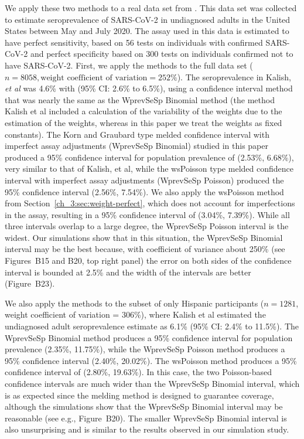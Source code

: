 We apply these two methods to a real data set from \citep{Kali:2021}.
This data set was collected to estimate seroprevalence of SARS-CoV-2 in undiagnosed adults in the United States between May and July 2020.
The assay used in this data is estimated to have perfect sensitivity, based on 56 tests on individuals with confirmed SARS-CoV-2 and perfect specificity based on 300 tests on individuals confirmed not to have SARS-CoV-2.
First, we apply the methods to the full data set (\( n = 8058, \text{weight coefficient of variation} = 252\%\)).
The seroprevalence in Kalish, {\it et al } was 4.6\% with (95\% CI: 2.6\% to 6.5\%), using a confidence interval method that was nearly the same as the WprevSeSp Binomial method (the method Kalish et al included a calculation of the variability of the weights due to the estimation of the weights, whereas in this paper we treat the weights as fixed constants).
The Korn and Graubard type melded confidence interval with imperfect assay adjustments (WprevSeSp Binomial) studied in this paper produced a 95\% confidence interval for population prevalence of (2.53\%, 6.68\%), very similar to that of Kalish, et al, while the wsPoisson type melded confidence interval with imperfect assay adjustments (WprevSeSp Poisson) produced the 95\% confidence interval (2.56\%, 7.54\%).
We also apply the wsPoisson method from Section~\ref{ch_3:sec:weight-perfect}, which does not account for imperfections in the assay, resulting in a 95\% confidence interval of (3.04\%, 7.39\%).
While all three intervals overlap to a large degree, the WprevSeSp Poisson interval is the widest.
Our simulations show that in this situation, the WprevSeSp Binomial interval may be the best because, with coefficient of variance about 250\% (see Figures~B15 and B20, top right panel) the error on both sides of the confidence interval is bounded at 2.5\% and the width of the intervals are better (Figure~B23).


We also apply the methods to the subset of only Hispanic participants (\( n = 1281 \), weight coefficient of variation = 306\%), where Kalish et al estimated the undiagnosed adult seroprevalence estimate as 6.1\% (95\% CI: 2.4\% to 11.5\%).
The WprevSeSp Binomial method produces a 95\% confidence interval for population prevalence (2.35\%, 11.75\%), while the WprevSeSp Poisson method produces a 95\% confidence interval (2.40\%, 20.02\%).
The wsPoisson method produces a 95\% confidence interval of (2.80\%, 19.63\%).
In this case, the two Poisson-based confidence intervals are much wider than the WprevSeSp Binomial interval, which is as expected since the melding method is designed to guarantee coverage, although the simulations show that the WprevSeSp Binomial interval may be reasonable (see e.g., Figure~B20).
The smaller WprevSeSp Binomial interval is also unsurprising and is similar to the results observed in our simulation study.

